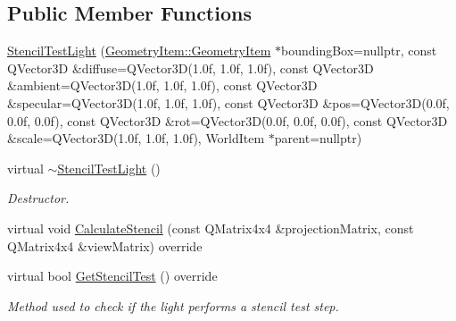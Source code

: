 \subsection*{Public Member Functions}
\begin{DoxyCompactItemize}
\item 
\mbox{\hyperlink{class_geometry_engine_1_1_geometry_world_item_1_1_geometry_light_1_1_stencil_test_light_af2846d81fd5ca495ad936e6ebafd4772}{Stencil\+Test\+Light}} (\mbox{\hyperlink{class_geometry_engine_1_1_geometry_world_item_1_1_geometry_item_1_1_geometry_item}{Geometry\+Item\+::\+Geometry\+Item}} $\ast$bounding\+Box=nullptr, const Q\+Vector3D \&diffuse=Q\+Vector3D(1.\+0f, 1.\+0f, 1.\+0f), const Q\+Vector3\+D \&ambient=\+Q\+Vector3\+D(1.\+0f, 1.\+0f, 1.\+0f), const Q\+Vector3\+D \&specular=\+Q\+Vector3\+D(1.\+0f, 1.\+0f, 1.\+0f), const Q\+Vector3\+D \&pos=\+Q\+Vector3\+D(0.\+0f, 0.\+0f, 0.\+0f), const Q\+Vector3\+D \&rot=\+Q\+Vector3\+D(0.\+0f, 0.\+0f, 0.\+0f), const Q\+Vector3\+D \&scale=\+Q\+Vector3\+D(1.\+0f, 1.\+0f, 1.\+0f), World\+Item $\ast$parent=nullptr)
\item 
\mbox{\label{class_geometry_engine_1_1_geometry_world_item_1_1_geometry_light_1_1_stencil_test_light_add9ad2daf1dd851b0a473ce3d63f11d3}} 
virtual \mbox{\hyperlink{class_geometry_engine_1_1_geometry_world_item_1_1_geometry_light_1_1_stencil_test_light_add9ad2daf1dd851b0a473ce3d63f11d3}{$\sim$\+Stencil\+Test\+Light}} ()
\begin{DoxyCompactList}\small\item\em Destructor. \end{DoxyCompactList}\item 
virtual void \mbox{\hyperlink{class_geometry_engine_1_1_geometry_world_item_1_1_geometry_light_1_1_stencil_test_light_aa1d9d4bf4f47e6e55dbb1706a7e28697}{Calculate\+Stencil}} (const Q\+Matrix4x4 \&projection\+Matrix, const Q\+Matrix4x4 \&view\+Matrix) override
\item 
\mbox{\label{class_geometry_engine_1_1_geometry_world_item_1_1_geometry_light_1_1_stencil_test_light_ab25dbb6bfdeba423fcacfbae68effcdb}} 
virtual bool \mbox{\hyperlink{class_geometry_engine_1_1_geometry_world_item_1_1_geometry_light_1_1_stencil_test_light_ab25dbb6bfdeba423fcacfbae68effcdb}{Get\+Stencil\+Test}} () override
\begin{DoxyCompactList}\small\item\em Method used to check if the light performs a stencil test step. \end{DoxyCompactList}\end{DoxyCompactItemize}
